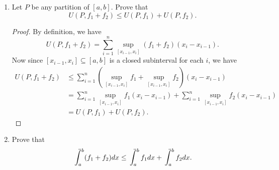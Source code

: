 \documentclass[12pt]{article}
\def\upint{\mathchoice%
    {\mkern13mu\overline{\vphantom{\intop}\mkern7mu}\mkern-20mu}%
    {\mkern7mu\overline{\vphantom{\intop}\mkern7mu}\mkern-14mu}%
    {\mkern7mu\overline{\vphantom{\intop}\mkern7mu}\mkern-14mu}%
    {\mkern7mu\overline{\vphantom{\intop}\mkern7mu}\mkern-14mu}%
  \int}
\begin{document}
\begin{enumerate}
\begin{enumerate}
\begin{proof}
\end{proof}

\item
Let $P$ be any partition of $[a,b]$.  Prove that
\[U(P,f_1+f_2)\le U(P,f_1)+U(P,f_2).\]

\begin{proof}
    By definition, we have
    \[U(P,f_1+f_2) = \sum_{i=1}^n\sup_{[x_{i-1},x_i]}(f_1+f_2)(x_i-x_{i-1}).\]
    Now since $[x_{i-1},x_i]\subseteq[a,b]$ is a closed subinterval for each $i$, we have
    \begin{align*}
        U(P,f_1+f_2) 
            &\leq \sum_{i=1}^n\left(\sup_{[x_{i-1},x_i]}f_1+\sup_{[x_{i-1},x_i]}f_2\right)(x_i-x_{i-1}) \\
            &= \sum_{i=1}^n\sup_{[x_{i-1},x_i]}f_1(x_i-x_{i-1})+\sum_{i=1}^n\sup_{[x_{i-1},x_i]}f_2(x_i-x_{i-1}) \\
            &= U(P,f_1) + U(P,f_2).
    \end{align*}
    
\end{proof}

\newpage
\item\label{partb}
Prove that
\[\upint_a^b(f_1+f_2)dx\le \upint_a^bf_1dx+\upint_a^bf_2dx.\]


\end{enumerate}
\end{enumerate}
\end{document}
